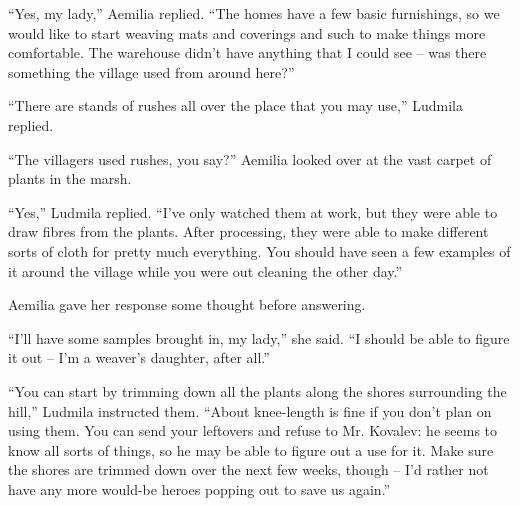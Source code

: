  

“Yes, my lady,” Aemilia replied. “The homes have a few basic furnishings, so we would like to start weaving mats and coverings and such to make things more comfortable. The warehouse didn’t have anything that I could see – was there something the village used from around here?”

 

“There are stands of rushes all over the place that you may use,” Ludmila replied.

 

“The villagers used rushes, you say?” Aemilia looked over at the vast carpet of plants in the marsh.

 

“Yes,” Ludmila replied. “I’ve only watched them at work, but they were able to draw fibres from the plants. After processing, they were able to make different sorts of cloth for pretty much everything. You should have seen a few examples of it around the village while you were out cleaning the other day.”

 

Aemilia gave her response some thought before answering.

 

“I’ll have some samples brought in, my lady,” she said. “I should be able to figure it out – I’m a weaver’s daughter, after all.”

 

“You can start by trimming down all the plants along the shores surrounding the hill,” Ludmila instructed them. “About knee-length is fine if you don’t plan on using them. You can send your leftovers and refuse to Mr. Kovalev: he seems to know all sorts of things, so he may be able to figure out a use for it. Make sure the shores are trimmed down over the next few weeks, though – I’d rather not have any more would-be heroes popping out to save us again.”